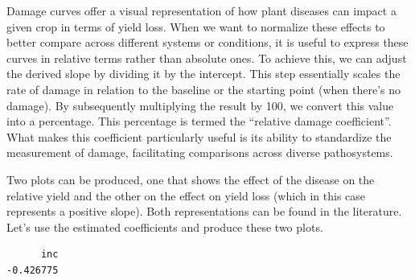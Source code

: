 \documentclass[
  letterpaper,
]{book}
\newenvironment{Shaded}{\begin{snugshade}}{\end{snugshade}}
\newcommand{\CommentTok}[1]{\textcolor[rgb]{0.37,0.37,0.37}{#1}}
\newcommand{\DecValTok}[1]{\textcolor[rgb]{0.68,0.00,0.00}{#1}}
\newcommand{\NormalTok}[1]{\textcolor[rgb]{0.00,0.23,0.31}{#1}}
\newcommand{\OtherTok}[1]{\textcolor[rgb]{0.00,0.23,0.31}{#1}}
\newcommand{\SpecialCharTok}[1]{\textcolor[rgb]{0.37,0.37,0.37}{#1}}
\begin{document}
Damage curves offer a visual representation of how plant diseases can
impact a given crop in terms of yield loss. When we want to normalize
these effects to better compare across different systems or conditions,
it is useful to express these curves in relative terms rather than
absolute ones. To achieve this, we can adjust the derived slope by
dividing it by the intercept. This step essentially scales the rate of
damage in relation to the baseline or the starting point (when there's
no damage). By subsequently multiplying the result by 100, we convert
this value into a percentage. This percentage is termed the ``relative
damage coefficient''. What makes this coefficient particularly useful is
its ability to standardize the measurement of damage, facilitating
comparisons across diverse pathosystems.

Two plots can be produced, one that shows the effect of the disease on
the relative yield and the other on the effect on yield loss (which in
this case represents a positive slope). Both representations can be
found in the literature. Let's use the estimated coefficients and
produce these two plots.

\begin{Shaded}
\end{Shaded}

\begin{verbatim}
      inc 
-0.426775 
\end{verbatim}
\end{document}
